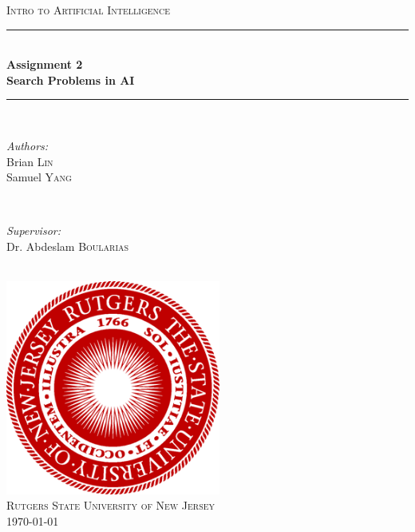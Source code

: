 \documentclass[12pt]{article}
\begin{document}
	
	\begin{titlepage}
		\newcommand{\HRule}{\noindent\rule{6.5in}{1pt}} %
		
		\centering
		
		\textsc{\Large Intro to Artificial Intelligence}\\[.75cm]
		
		\noindent\rule{6.5in}{1.5pt}\\[.75cm]
		{ \huge \bfseries Assignment 2}\\[.4cm]
		{ \large \bfseries Search Problems in AI}\\[.2cm]
		\noindent\rule{6.5in}{1.5pt}\\[1cm]
		
		
		\begin{minipage}{0.4\textwidth}
			\begin{flushleft} \large
				\emph{Authors:}\\
				Brian \textsc{Lin} \\
				Samuel \textsc{Yang}
			\end{flushleft}
		\end{minipage}
		~
		\begin{minipage}{0.4\textwidth}
			\begin{flushright} \large
				\emph{Supervisor:} \\
				Dr. Abdeslam  \textsc{Boularias} %
			\end{flushright}
		\end{minipage}\\[2cm]

		\includegraphics[width=200pt,height=200pt]{RutgersLogo.png}\\[1.5cm]
		\textsc{\Large Rutgers State University of New Jersey}\\[1cm]
		{\large \today}\\[2cm]
		
		\vfill %
		
	\end{titlepage}
	
\end{document}
